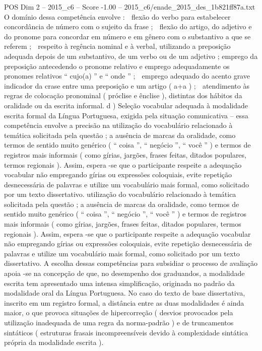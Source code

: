 \begin{textsample}{POS Dim 2 – 2015\_c6 – Score -1.00 – 2015\_c6/enade\_2015\_des\_1b821ff87a.txt}
O domínio dessa competência envolve :  flexão do verbo para estabelecer concordância de número com o sujeito da frase ;  flexão do artigo, do adjetivo e do pronome para concordar em número e em gênero com o substantivo a que se referem ;  respeito à regência nominal e à verbal, utilizando a preposição adequada depois de um substantivo, de um verbo ou de um adjetivo ; emprego da preposição antecedendo o pronome relativo e emprego adequadamente os pronomes relativos “ cujo(a) ” e “ onde ” ;  emprego adequado do acento grave indicador da crase entre uma preposição e um artigo ( a+a ) ;  atendimento às regras de colocação pronominal ( próclise e ênclise ), distintas dos hábitos da oralidade ou da escrita informal. d ) Seleção vocabular adequada à modalidade escrita formal da Língua Portuguesa, exigida pela situação comunicativa – essa competência envolve a precisão na utilização do vocabulário relacionado à temática solicitada pela questão ; a ausência de marcas da oralidade, como termos de sentido muito genérico ( “ coisa ”, “ negócio ”, “ você ” ) e termos de registros mais informais ( como gírias, jargões, frases feitas, ditados populares, termos regionais ).
Assim, espera -se que o participante respeite a adequação vocabular não empregando gírias ou expressões coloquiais, evite repetição desnecessária de palavras e utilize um vocabulário mais formal, como solicitado por um texto dissertativo. utilização do vocabulário relacionado à temática solicitada pela questão ; a ausência de marcas da oralidade, como termos de sentido muito genérico ( “ coisa ”, “ negócio ”, “ você ” ) e termos de registros mais informais ( como gírias, jargões, frases feitas, ditados populares, termos regionais ).
Assim, espera -se que o participante respeite a adequação vocabular não empregando gírias ou expressões coloquiais, evite repetição desnecessária de palavras e utilize um vocabulário mais formal, como solicitado por um texto dissertativo.
A escolha dessas competências para subsidiar o processo de avaliação apoia -se na concepção de que, no desempenho dos graduandos, a modalidade escrita tem apresentado uma intensa simplificação, originada no padrão da modalidade oral da Língua Portuguesa.
No caso do texto de base dissertativa, inscrito em um registro formal, a distância entre as duas modalidades é ainda maior, o que provoca situações de hipercorreção ( desvios provocados pela utilização inadequada de uma regra da norma-padrão ) e de truncamentos sintáticos ( estruturas frasais incompreensíveis devido à complexidade sintática própria da modalidade escrita ).

\end{textsample}
